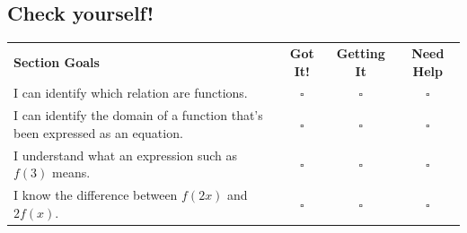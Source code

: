\documentclass[oneside,10pt]{book}
\begin{document}
\newpage



\subsection*{Check yourself!}


\begin{tabular}{@{}p{4.5in} c c c}
\textbf{Section Goals} & \textbf{Got It!} & \textbf{Getting It} & \textbf{Need Help}\\
I can identify which relation are functions. & $\square$ & $\square$ & $\square $ \\
I can identify the domain of a function that's been expressed as an equation. & $\square$ & $\square$ & $\square $ \\
I understand what an expression such as $f(3)$ means. & $\square$ & $\square$ & $\square $ \\
I know the difference between $f(2x)$ and $2f(x)$. & $\square$ & $\square$ & $\square $ \\


\end{tabular}
\end{document}
